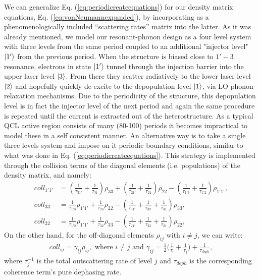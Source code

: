 \documentclass[10pt,letterpaper]{article}
\begin{document}
We can generalize Eq. (\ref{eq:periodicreateequations}) for our density matrix equations, Eq. (\ref{eq:vonNeumannexpanded}), by incorporating as a phenomenologically included ``scattering rates'' matrix into the latter. As it was already mentioned, we model our resonant-phonon design as a four level system with three levels from the same period coupled to an additional "injector level" $\Ket{1'}$ from the previous period. When the structure is biased close to $1'-3$ resonance, electrons in state $\Ket{1'}$ tunnel through the injection barrier into the upper laser level $\Ket{3}$. From there they scatter radiatively to the lower laser level $\Ket{2}$ and hopefully quickly de-excite to the depopulation level $\Ket{1}$, via 
LO phonon relaxation mechanisms. Due to the periodicity of the structure, this depopulation level is in fact the injector level of the next period and again the same procedure is repeated until the current is extracted out of the heterostructure. As a typical QCL active region consists of many (80-100) periods it becomes impractical to model these in a self consistent manner. An alternative way is to take a single three levels system and impose on it periodic boundary conditions, similar to what was done in Eq. (\ref{eq:periodicreateequations}). This strategy is implemented through the collision terms of the diagonal elements (i.e. populations) of the density matrix, and namely:
\begin{align}
 coll_{1'1'} &= (\frac{1}{\tau_{31'}}  + \frac{1}{\tau_{31}})\rho_{33} + (\frac{1}{\tau_{21'}}  + \frac{1}{\tau_{21}})\rho_{22}
 - (\frac{1}{\tau_{1'3}}  + \frac{1}{\tau_{1'2}} )\rho_{1'1'}, \\
 coll_{33} &= \frac{1}{\tau_{1'3}} \rho_{1'1'} + \frac{1}{\tau_{23}}\rho_{22}
 - (\frac{1}{\tau_{31'}} + \frac{1}{\tau_{32}} + \frac{1}{\tau_{31}} )\rho_{33}, \\
 coll_{22} &= \frac{1}{\tau_{1'2}} \rho_{1'1'} + \frac{1}{\tau_{32}}\rho_{33}
 - (\frac{1}{\tau_{21'}} + \frac{1}{\tau_{23}} + \frac{1}{\tau_{21}} )\rho_{22},  \label{eq:collisionpop}
\end{align}
On the other hand, for the off-diagonal elements $\rho_{ij}$ with $i \neq j$, we can write: 
\begin{align}
coll_{ij} = \gamma_{ij} \rho_{ij} , \text{ where } i \neq j \text{ and } \gamma_{ij} = \frac{1}{2} \big( \frac{1}{\tau_i} + 
\frac{1}{\tau_j} \big) + \frac{1}{\tau_{deph}}, \label{eq:collisioncoh}
\end{align}
where $\tau_j^{-1}$ is the total outscattering rate of level $j$ and $\tau_{deph}$ is the corresponding coherence term's pure dephasing rate.
  
\end{document}
